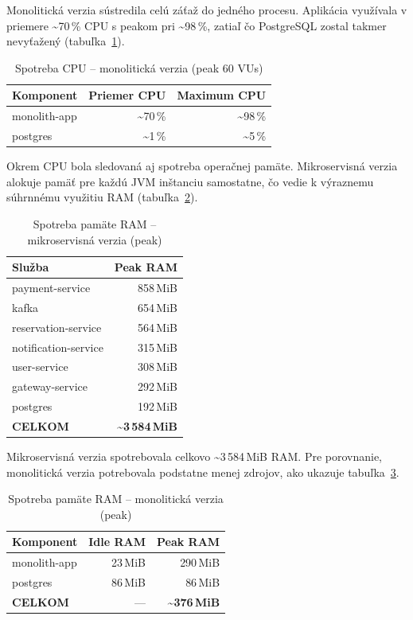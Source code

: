 Monolitická verzia sústredila celú záťaž do jedného procesu. Aplikácia využívala v priemere \textasciitilde70\,\% CPU s peakom pri \textasciitilde98\,\%, zatiaľ čo PostgreSQL zostal takmer nevyťažený (tabuľka~\ref{tab:eval-cpu-monolith}).

\begin{table}[H]
\centering
\begin{tabular}{|l|r|r|}
\hline
Komponent & Priemer CPU & Maximum CPU \\ \hline
monolith-app & \textasciitilde70\,\% & \textasciitilde98\,\% \\ \hline
postgres     & \textasciitilde1\,\%  & \textasciitilde5\,\%  \\ \hline
\end{tabular}
\caption{Spotreba CPU -- monolitická verzia (peak 60 VUs)}
\label{tab:eval-cpu-monolith}
\end{table}

Okrem CPU bola sledovaná aj spotreba operačnej pamäte. Mikroservisná verzia alokuje pamäť pre každú JVM inštanciu samostatne, čo vedie k výraznemu súhrnnému využitiu RAM (tabuľka~\ref{tab:eval-ram-micro}).

\begin{table}[H]
\centering
\begin{tabular}{|l|r|}
\hline
Služba & Peak RAM \\ \hline
payment-service      & 858\,MiB \\ \hline
kafka                & 654\,MiB \\ \hline
reservation-service  & 564\,MiB \\ \hline
notification-service & 315\,MiB \\ \hline
user-service         & 308\,MiB \\ \hline
gateway-service      & 292\,MiB \\ \hline
postgres             & 192\,MiB \\ \hline
\textbf{CELKOM}      & \textbf{\textasciitilde3\,584\,MiB} \\ \hline
\end{tabular}
\caption{Spotreba pamäte RAM -- mikroservisná verzia (peak)}
\label{tab:eval-ram-micro}
\end{table}

Mikroservisná verzia spotrebovala celkovo \textasciitilde3\,584\,MiB RAM. Pre porovnanie, monolitická verzia potrebovala podstatne menej zdrojov, ako ukazuje tabuľka~\ref{tab:eval-ram-monolith}.

\begin{table}[H]
\centering
\begin{tabular}{|l|r|r|}
\hline
Komponent & Idle RAM & Peak RAM \\ \hline
monolith-app & 23\,MiB & 290\,MiB \\ \hline
postgres     & 86\,MiB &  86\,MiB \\ \hline
\textbf{CELKOM} & --- & \textbf{\textasciitilde376\,MiB} \\ \hline
\end{tabular}
\caption{Spotreba pamäte RAM -- monolitická verzia (peak)}
\label{tab:eval-ram-monolith}
\end{table}

